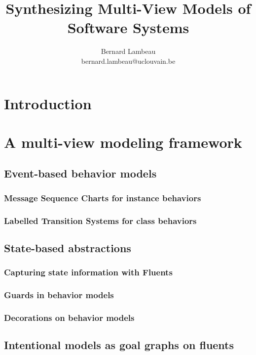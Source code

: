 \documentclass[dvips,a4paper,11pt]{report}
\begin{document}

\title{
  Synthesizing Multi-View Models of Software Systems
}
\author{Bernard Lambeau \\ bernard.lambeau@uclouvain.be}
\maketitle




\tableofcontents
\listoffigures
\listoftables


\chapter{Introduction}
\chapter{A multi-view modeling framework}
  \section{Event-based behavior models}
    \subsection{Message Sequence Charts for instance behaviors}
    \subsection{Labelled Transition Systems for class behaviors}
  \section{State-based abstractions}
    \subsection{Capturing state information with Fluents}
    \subsection{Guards in behavior models}
    \subsection{Decorations on behavior models}
  \section{Intentional models as goal graphs on fluents}
\end{document}
